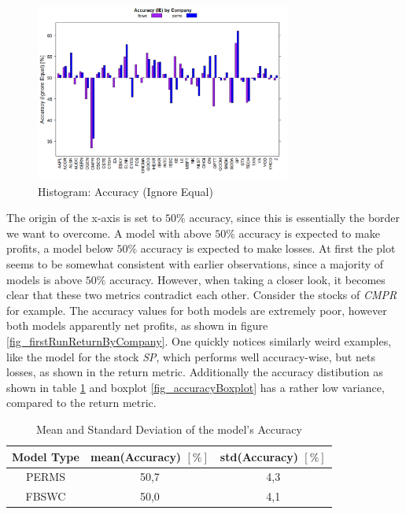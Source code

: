 \begin{figure}[h]
	\centering
  	\includegraphics[width=0.75\textwidth]{accuracyByCompany}
	\caption{Histogram: Accuracy (Ignore Equal)}
	\label{fig_accuracyByCompany}
\end{figure}

The origin of the x-axis is set to $50\%$ accuracy, since this is essentially the border we want to overcome. A model with above $50\%$ accuracy is expected to make profits, a model below $50\%$ accuracy is expected to make losses. At first the plot seems to be somewhat consistent with earlier observations, since a majority of models is above $50\%$ accuracy. However, when taking a closer look, it becomes clear that these two metrics contradict each other. Consider the stocks of \textit{CMPR} for example. The accuracy values for both models are extremely poor, however both models apparently net profits, as shown in figure \ref{fig_firstRunReturnByCompany}. One quickly notices similarly weird examples, like the model for the stock \textit{SP}, which performs well accuracy-wise, but nets losses, as shown in the return metric. Additionally the accuracy distibution as shown in table \ref{table_firstRunAccuracy} and boxplot \ref{fig_accuracyBoxplot} has a rather low variance, compared to the return metric.

\begin{table}
\label{table_firstRunAccuracy}	
\caption{Mean and Standard Deviation of the model's Accuracy}
\begin{tabular}{ c | c | c}		
  Model Type & mean(Accuracy) $[\%]$ & std(Accuracy) $[\%]$\\
  \hline
  PERMS & 50,7 & 4,3\\
  FBSWC & 50,0 & 4,1\\
\end{tabular}
\end{table}

